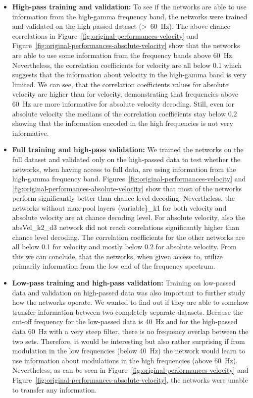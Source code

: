 \begin{itemize}
    \item \textbf{High-pass training and validation:} To see if the networks are able to use information from the high-gamma frequency band, the networks were trained and validated on the high-passed dataset (>~60~Hz).
    The above chance correlations in Figure~\ref{fig:original-performances-velocity} and Figure~\ref{fig:original-performances-absolute-velocity} show that the networks are able to use some information from the frequency bands above 60~Hz. 
    Nevertheless, the correlation coefficients for velocity are all below 0.1 which suggests that the information about velocity in the high-gamma band is very limited.
    We can see, that the correlation coefficients values for absolute velocity are higher than for velocity, demonstrating that frequencies above 60~Hz are more informative for absolute velocity decoding.
    Still, even for absolute velocity the medians of the correlation coefficients stay below 0.2 showing that the information encoded in the high frequencies is not very informative.
    
    \item \textbf{Full training and high-pass validation:} We trained the networks on the full dataset and validated only on the high-passed data to test whether the networks, when having access to full data, are using information from the high-gamma frequency band.
    Figures~\ref{fig:original-performances-velocity} and \ref{fig:original-performances-absolute-velocity} show that most of the networks perform significantly better than chance level decoding.
    Nevertheless, the networks without max-pool layers \{variable\}\_k1 for both velocity and absolute velocity are at chance decoding level. For absolute velocity, also the absVel\_k2\_d3 network did not reach correlations significantly higher than chance level decoding. 
    The correlation coefficients for the other networks are all below 0.1 for velocity and mostly below 0.2 for absolute velocity.
    From this we can conclude, that the networks, when given access to, utilize primarily information from the low end of the frequency spectrum.
    \item \textbf{Low-pass training and high-pass validation:}
    Training on low-passed data and validation on high-passed data was also important to further study how the networks operate.
    We wanted to find out if they are able to somehow transfer information between two completely separate datasets.
    Because the cut-off frequency for the low-passed data is 40~Hz and for the high-passed data 60~Hz with a very steep filter, there is no frequency overlap between the two sets.
    Therefore, it would be interesting but also rather surprising if from modulation in the low frequencies (below 40~Hz) the network would learn to use information about modulations in the high frequencies (above 60~Hz).
    Nevertheless, as can be seen in Figure~\ref{fig:original-performances-velocity} and Figure~\ref{fig:original-performances-absolute-velocity}, the networks were unable to transfer any information.
    

\end{itemize}
